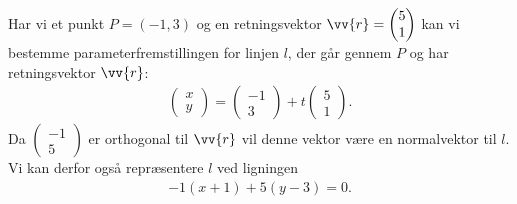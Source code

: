 \begin{exa}
Har vi et punkt $P = (-1,3)$ og en retningsvektor $\vv{r} = \begin{pmatrix}
5 \\ 1
\end{pmatrix}$ kan vi bestemme parameterfremstillingen for linjen $l$, der går gennem $P$ og har retningsvektor $\vv{r}$:
\begin{align*}
\begin{pmatrix}
x \\ y
\end{pmatrix}
= 
\begin{pmatrix}
-1 \\ 3
\end{pmatrix} +  
t
\begin{pmatrix}
5 \\ 1
\end{pmatrix}.
\end{align*}
Da $\begin{pmatrix}
-1 \\ 5
\end{pmatrix}$
er orthogonal til $\vv{r}$ vil denne vektor være en normalvektor til $l$. Vi kan derfor også repræsentere $l$ ved ligningen
\begin{align*}
-1(x+1) + 5(y-3) = 0.
\end{align*}
\end{exa}

